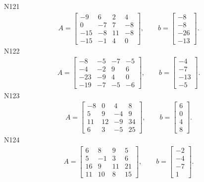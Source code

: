 \documentclass[11pt]{report}
\begin{document}
N121
\begin{align*}
 A = \left[\begin{matrix}-9 & 6 & 2 & 4\\0 & -7 & 7 & -8\\-15 & -8 & 11 & -8\\-15 & -1 & 4 & 0\end{matrix}\right],
\qquad b = \left[\begin{matrix}-8\\-8\\-26\\-13\end{matrix}\right]. 
 \end{align*}
N122
\begin{align*}
 A = \left[\begin{matrix}-8 & -5 & -7 & -5\\-4 & -2 & 9 & 6\\-23 & -9 & 4 & 0\\-19 & -7 & -5 & -6\end{matrix}\right],
\qquad b = \left[\begin{matrix}-4\\-7\\-13\\-5\end{matrix}\right]. 
 \end{align*}
N123
\begin{align*}
 A = \left[\begin{matrix}-8 & 0 & 4 & 8\\5 & 9 & -4 & 9\\11 & 12 & -9 & 34\\6 & 3 & -5 & 25\end{matrix}\right],
\qquad b = \left[\begin{matrix}6\\0\\4\\8\end{matrix}\right]. 
 \end{align*}
N124
\begin{align*}
 A = \left[\begin{matrix}6 & 8 & 9 & 5\\5 & -1 & 3 & 6\\16 & 9 & 11 & 21\\11 & 10 & 8 & 15\end{matrix}\right],
\qquad b = \left[\begin{matrix}-2\\-4\\-7\\1\end{matrix}\right]. 
 \end{align*}
\end{document}
